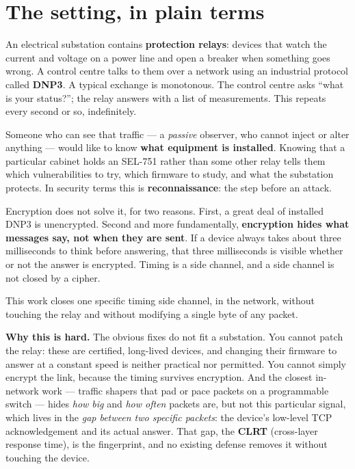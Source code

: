 \documentclass[10pt,a4paper,oneside]{article}
\begin{document}
\vspace{0.4em}
{\small\tableofcontents}
\clearpage

\section{The setting, in plain terms}

An electrical substation contains \textbf{protection relays}: devices that watch the
current and voltage on a power line and open a breaker when something goes wrong. A
control centre talks to them over a network using an industrial protocol called
\textbf{DNP3}. A typical exchange is monotonous. The control centre asks ``what is your
status?''; the relay answers with a list of measurements. This repeats every second or so,
indefinitely.

Someone who can see that traffic --- a \emph{passive} observer, who cannot inject or alter
anything --- would like to know \textbf{what equipment is installed}. Knowing that a
particular cabinet holds an SEL-751 rather than some other relay tells them which
vulnerabilities to try, which firmware to study, and what the substation protects. In
security terms this is \textbf{reconnaissance}: the step before an attack.

Encryption does not solve it, for two reasons. First, a great deal of installed DNP3 is
unencrypted. Second and more fundamentally, \textbf{encryption hides what messages say,
not when they are sent}. If a device always takes about three milliseconds to think before
answering, that three milliseconds is visible whether or not the answer is encrypted.
Timing is a side channel, and a side channel is not closed by a cipher.

This work closes one specific timing side channel, in the network, without touching the
relay and without modifying a single byte of any packet.

\textbf{Why this is hard.} The obvious fixes do not fit a substation. You cannot patch the
relay: these are certified, long-lived devices, and changing their firmware to answer at a
constant speed is neither practical nor permitted. You cannot simply encrypt the link, because
the timing survives encryption. And the closest in-network work --- traffic shapers that pad
or pace packets on a programmable switch --- hides \emph{how big} and \emph{how often} packets
are, but not this particular signal, which lives in the \emph{gap between two specific
packets}: the device's low-level TCP acknowledgement and its actual answer. That gap, the
\textbf{CLRT} (cross-layer response time), is the fingerprint, and no existing defense removes
it without touching the device.
\end{document}

